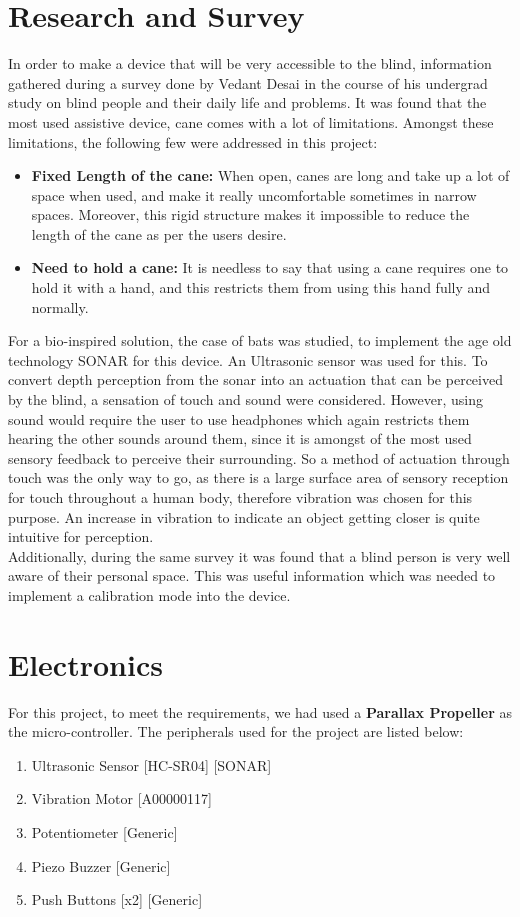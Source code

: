 \documentclass[twoside,11pt,letter]{article}
\begin{document}
\section{Research and Survey}
In order to make a device that will be very accessible to the blind, information gathered during a survey done by Vedant Desai in the course of his undergrad study on blind people and their daily life and problems. It was found that the most used assistive device, cane comes with a lot of limitations. Amongst these limitations, the following few were addressed in this project:
\begin{itemize}
    \item \textbf{Fixed Length of the cane:} When open, canes are long and take up a lot of space when used, and make it really uncomfortable sometimes in narrow spaces. Moreover, this rigid structure makes it impossible to reduce the length of the cane as per the users desire.
    \item \textbf{Need to hold a cane:} It is needless to say that using a cane requires one to hold it with a hand, and this restricts them from using this hand fully and normally. 
\end{itemize}
For a bio-inspired solution, the case of bats was studied, to implement the age old technology SONAR for this device. An Ultrasonic sensor was used for this. To convert depth perception from the sonar into an actuation that can be perceived by the blind, a sensation of touch and sound were considered. However, using sound would require the user to use headphones which again restricts them hearing the other sounds around them, since it is amongst of the most used sensory feedback to perceive their surrounding. So a method of actuation through touch was the only way to go, as there is a large surface area of sensory reception for touch throughout a human body, therefore vibration was chosen for this purpose. An increase in vibration to indicate an object getting closer is quite intuitive for perception. \\
Additionally, during the same survey it was found that a blind person is very well aware of their personal space. This was useful information which was needed to implement a calibration mode into the device.

\section{Electronics}
For this project, to meet the requirements, we had used a \textbf{Parallax Propeller} as the micro-controller. The peripherals used for the project are listed below: 
\begin{enumerate}
    \item Ultrasonic Sensor [HC-SR04] [SONAR] 
    \item Vibration Motor [A00000117]
    \item Potentiometer [Generic]
    \item Piezo Buzzer [Generic]
    \item Push Buttons [x2] [Generic]
\end{enumerate}
\end{document}
